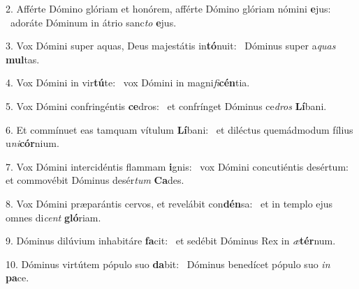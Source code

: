 2. Afférte Dómino glóriam et honórem, afférte Dómino glóriam nómini \textbf{e}jus: \ast\  adoráte Dóminum in átrio sanc\textit{to} \textbf{e}jus.\

3. Vox Dómini super aquas, Deus majestátis in\textbf{tó}nuit: \ast\  Dóminus super a\textit{quas} \textbf{mul}tas.\

4. Vox Dómini in vir\textbf{tú}te: \ast\  vox Dómini in magni\textit{fi}\textbf{cén}tia.\

5. Vox Dómini confringéntis \textbf{ce}dros: \ast\  et confrínget Dóminus ce\textit{dros} \textbf{Lí}bani.\

6. Et commínuet eas tamquam vítulum \textbf{Lí}bani: \ast\  et diléctus quemádmodum fílius u\textit{ni}\textbf{cór}nium.\

7. Vox Dómini intercidéntis flammam \textbf{i}gnis: \ast\  vox Dómini concutiéntis desértum: et commovébit Dóminus desér\textit{tum} \textbf{Ca}des.\

8. Vox Dómini præparántis cervos, et revelábit con\textbf{dén}sa: \ast\  et in templo ejus omnes di\textit{cent} \textbf{gló}riam.\

9. Dóminus dilúvium inhabitáre \textbf{fa}cit: \ast\  et sedébit Dóminus Rex in \textit{æ}\textbf{tér}num.\

10. Dóminus virtútem pópulo suo \textbf{da}bit: \ast\  Dóminus benedícet pópulo suo \textit{in} \textbf{pa}ce.\

